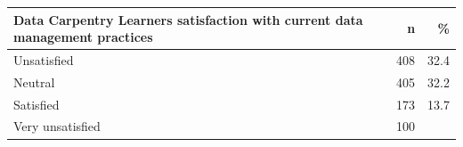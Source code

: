 \documentclass[]{article}
\begin{document}
\begin{longtable}[]{@{}lrr@{}}
\toprule
\begin{minipage}[b]{0.80\columnwidth}\raggedright\strut
Data Carpentry Learners satisfaction with current data management
practices\strut
\end{minipage} & \begin{minipage}[b]{0.05\columnwidth}\raggedleft\strut
n\strut
\end{minipage} & \begin{minipage}[b]{0.06\columnwidth}\raggedleft\strut
\%\strut
\end{minipage}\tabularnewline
\midrule
\endhead
\begin{minipage}[t]{0.80\columnwidth}\raggedright\strut
Unsatisfied\strut
\end{minipage} & \begin{minipage}[t]{0.05\columnwidth}\raggedleft\strut
408\strut
\end{minipage} & \begin{minipage}[t]{0.06\columnwidth}\raggedleft\strut
32.4\strut
\end{minipage}\tabularnewline
\begin{minipage}[t]{0.80\columnwidth}\raggedright\strut
Neutral\strut
\end{minipage} & \begin{minipage}[t]{0.05\columnwidth}\raggedleft\strut
405\strut
\end{minipage} & \begin{minipage}[t]{0.06\columnwidth}\raggedleft\strut
32.2\strut
\end{minipage}\tabularnewline
\begin{minipage}[t]{0.80\columnwidth}\raggedright\strut
Satisfied\strut
\end{minipage} & \begin{minipage}[t]{0.05\columnwidth}\raggedleft\strut
173\strut
\end{minipage} & \begin{minipage}[t]{0.06\columnwidth}\raggedleft\strut
13.7\strut
\end{minipage}\tabularnewline
\begin{minipage}[t]{0.80\columnwidth}\raggedright\strut
Very unsatisfied\strut
\end{minipage} & \begin{minipage}[t]{0.05\columnwidth}\raggedleft\strut
100\strut
\end{minipage} & \begin{minipage}[t]{0.06\columnwidth}\raggedleft\strut

\end{minipage}
\end{longtable}
\end{document}
